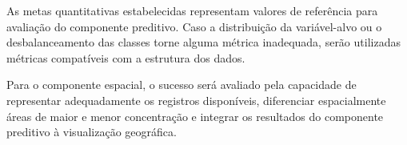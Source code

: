 \documentclass[11pt,a4paper]{article}
\begin{document}
As metas quantitativas estabelecidas representam valores de referência para avaliação do componente preditivo. Caso a distribuição da variável-alvo ou o desbalanceamento das classes torne alguma métrica inadequada, serão utilizadas métricas compatíveis com a estrutura dos dados.

Para o componente espacial, o sucesso será avaliado pela capacidade de representar adequadamente os registros disponíveis, diferenciar espacialmente áreas de maior e menor concentração e integrar os resultados do componente preditivo à visualização geográfica.


\newpage

\end{document}
